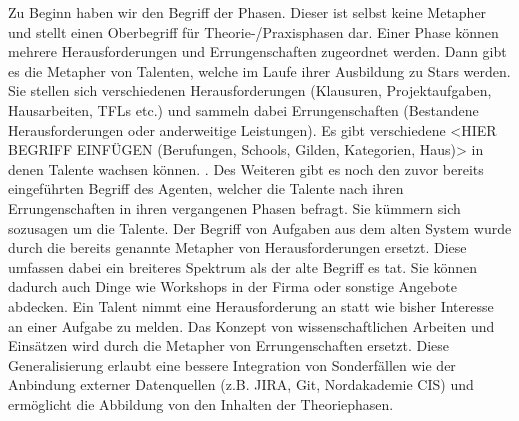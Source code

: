 \documentclass[
  12pt,
  ngerman,
  a4paper,
]{article}
\begin{document}
Zu Beginn haben wir den Begriff der Phasen. Dieser ist selbst keine
Metapher und stellt einen Oberbegriff für Theorie-/Praxisphasen dar.
Einer Phase können mehrere Herausforderungen und Errungenschaften
zugeordnet werden. Dann gibt es die Metapher von Talenten, welche im
Laufe ihrer Ausbildung zu Stars werden. Sie stellen sich verschiedenen
Herausforderungen (Klausuren, Projektaufgaben, Hausarbeiten, TFLs etc.)
und sammeln dabei Errungenschaften (Bestandene Herausforderungen oder
anderweitige Leistungen). Es gibt verschiedene \textless{}HIER BEGRIFF
EINFÜGEN (Berufungen, Schools, Gilden, Kategorien, Haus)\textgreater{}
in denen Talente wachsen können. . Des Weiteren gibt es noch den zuvor
bereits eingeführten Begriff des Agenten, welcher die Talente nach ihren
Errungenschaften in ihren vergangenen Phasen befragt. Sie kümmern sich
sozusagen um die Talente. Der Begriff von Aufgaben aus dem alten System
wurde durch die bereits genannte Metapher von Herausforderungen ersetzt.
Diese umfassen dabei ein breiteres Spektrum als der alte Begriff es tat.
Sie können dadurch auch Dinge wie Workshops in der Firma oder sonstige
Angebote abdecken. Ein Talent nimmt eine Herausforderung an statt wie
bisher Interesse an einer Aufgabe zu melden. Das Konzept von
wissenschaftlichen Arbeiten und Einsätzen wird durch die Metapher von
Errungenschaften ersetzt. Diese Generalisierung erlaubt eine bessere
Integration von Sonderfällen wie der Anbindung externer Datenquellen
(z.B. JIRA, Git, Nordakademie CIS) und ermöglicht die Abbildung von den
Inhalten der Theoriephasen.

  


\printnoidxglossary[sort=word]
\end{document}
